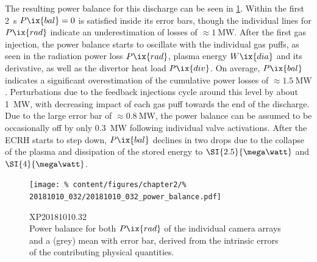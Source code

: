             The resulting power balance for this discharge can be seen in \cref{fig:20181010.32_balance}. Within the first \SI{2}{\second} $P\ix{bal}=0$ is satisfied inside its error bars, though the individual lines for $P\ix{rad}$ indicate an underestimation of losses of $\approx\SI{1}{\mega\watt}$. After the first gas injection, the power balance starts to oscillate with the individual gas puffs, as seen in the radiation power loss $P\ix{rad}$, plasma energy $W\ix{dia}$ and its derivative, as well as the divertor heat load $P\ix{div}$. On average, $P\ix{bal}$ indicates a significant overestimation of the cumulative power losses of $\approx\SI{1.5}{\mega\watt}$. Perturbations due to the feedback injections cycle around this level by about \SI{1}{\mega\watt}, with decreasing impact of each gas puff towards the end of the discharge. Due to the large error bar of $\approx\SI{0.8}{\mega\watt}$, the power balance can be assumed to be occasionally off by only \SI{0.3}{\mega\watt} following individual valve activations. After the ECRH starts to step down, $P\ix{bal}$ declines in two drops due to the collapse of the plasma and dissipation of the stored energy to $\-\SI{2.5}{\mega\watt}$ and $\-\SI{4}{\mega\watt}$.\\%
%
            \begin{figure}[t]%
                \centering%
                \texttt{[image: \%
                    content/figures/chapter2/\%
                    20181010\_032/20181010\_032\_power\_balance.pdf]}%
                \caption{XP20181010.32\\%
                    Power balance for both $P\ix{rad}$ of the individual camera arrays and a (grey) mean with error bar, derived from the intrinsic errors of the contributing physical quantities.}\label{fig:20181010.32_balance}%
            \end{figure}%
%
